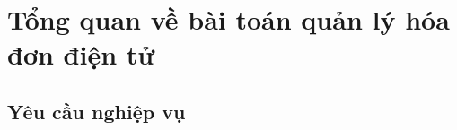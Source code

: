 \documentclass{report} %
\begin{document}

% 
% 
% 
% 
% 

% 
% 
% 
% 

% 
% 
% 

\chapter{Tổng quan về bài toán quản lý hóa đơn điện tử}
% 
% 
\section{Yêu cầu nghiệp vụ}
% 
% 
\end{document}
